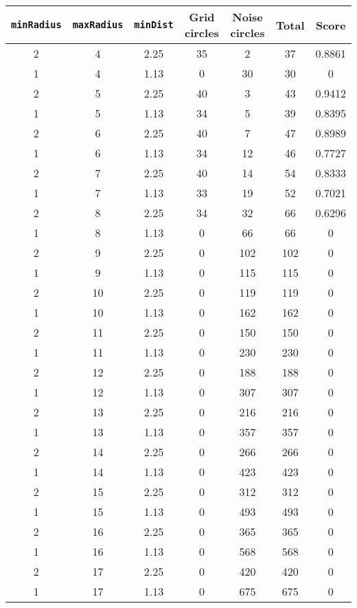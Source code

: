 \documentclass[letterpaper, 12pt]{article}
\begin{document}
\begin{longtable}{|c|c|c|c|c|c|c|}
\hline
\textbf{\texttt{minRadius}} & \textbf{\texttt{maxRadius}} & \textbf{\texttt{minDist}} & \textbf{Grid circles} & \textbf{Noise circles} & \textbf{Total} & \textbf{Score} \\
\hline
2 & 4 & 2.25 & 35 & 2 & 37 & 0.8861 \\
\hline
1 & 4 & 1.13 & 0 & 30 & 30 & 0 \\
\hline
2 & 5 & 2.25 & 40 & 3 & 43 & 0.9412 \\
\hline
1 & 5 & 1.13 & 34 & 5 & 39 & 0.8395 \\
\hline
2 & 6 & 2.25 & 40 & 7 & 47 & 0.8989 \\
\hline
1 & 6 & 1.13 & 34 & 12 & 46 & 0.7727 \\
\hline
2 & 7 & 2.25 & 40 & 14 & 54 & 0.8333 \\
\hline
1 & 7 & 1.13 & 33 & 19 & 52 & 0.7021 \\
\hline
2 & 8 & 2.25 & 34 & 32 & 66 & 0.6296 \\
\hline
1 & 8 & 1.13 & 0 & 66 & 66 & 0 \\
\hline
2 & 9 & 2.25 & 0 & 102 & 102 & 0 \\
\hline
1 & 9 & 1.13 & 0 & 115 & 115 & 0 \\
\hline
2 & 10 & 2.25 & 0 & 119 & 119 & 0 \\
\hline
1 & 10 & 1.13 & 0 & 162 & 162 & 0 \\
\hline
2 & 11 & 2.25 & 0 & 150 & 150 & 0 \\
\hline
1 & 11 & 1.13 & 0 & 230 & 230 & 0 \\
\hline
2 & 12 & 2.25 & 0 & 188 & 188 & 0 \\
\hline
1 & 12 & 1.13 & 0 & 307 & 307 & 0 \\
\hline
2 & 13 & 2.25 & 0 & 216 & 216 & 0 \\
\hline
1 & 13 & 1.13 & 0 & 357 & 357 & 0 \\
\hline
2 & 14 & 2.25 & 0 & 266 & 266 & 0 \\
\hline
1 & 14 & 1.13 & 0 & 423 & 423 & 0 \\
\hline
2 & 15 & 2.25 & 0 & 312 & 312 & 0 \\
\hline
1 & 15 & 1.13 & 0 & 493 & 493 & 0 \\
\hline
2 & 16 & 2.25 & 0 & 365 & 365 & 0 \\
\hline
1 & 16 & 1.13 & 0 & 568 & 568 & 0 \\
\hline
2 & 17 & 2.25 & 0 & 420 & 420 & 0 \\
\hline
1 & 17 & 1.13 & 0 & 675 & 675 & 0 \\

\end{longtable}
\end{document}
